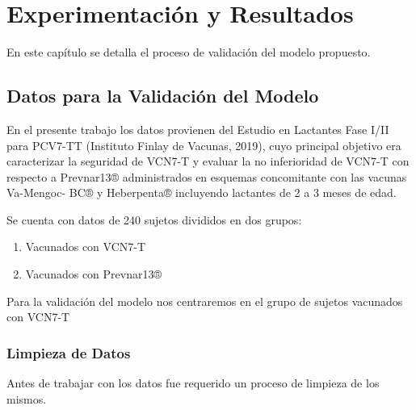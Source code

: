 \chapter{Experimentación y Resultados}\label{chapter:resultados}

En este capítulo se detalla el proceso de validación del modelo propuesto. 

\section{Datos para la Validación del Modelo}
En el presente trabajo los datos provienen del Estudio en Lactantes Fase I/II para PCV7-TT (Instituto Finlay de Vacunas, 2019), cuyo principal objetivo era caracterizar la seguridad de VCN7-T y evaluar la no inferioridad de VCN7-T con respecto a Prevnar13® administrados en esquemas concomitante con las vacunas Va-Mengoc- BC® y Heberpenta® incluyendo lactantes de 2 a 3 meses de edad.

Se cuenta con datos de 240 sujetos divididos en dos grupos:
\begin{enumerate}
    \item Vacunados con VCN7-T
    \item Vacunados con Prevnar13®
\end{enumerate}

Para la validación del modelo nos centraremos en el grupo de sujetos vacunados con VCN7-T

\subsection{Limpieza de Datos}
Antes de trabajar con los datos fue requerido un proceso de limpieza de los mismos. 


